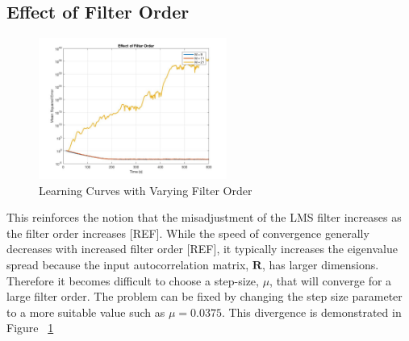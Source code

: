 \documentclass[journal]{IEEEtran}
\begin{document}
\subsection{Effect of Filter Order}
\begin{figure}[H]
  \centering
  \captionsetup{justification=centering}
  \includegraphics[width=0.55\textwidth, right] {Plots/Project1_Part3.jpg}
  \caption{Learning Curves with Varying Filter Order}
    \label{fig:filterorder1}
\end{figure}
This reinforces the notion that the misadjustment
of the LMS filter increases as the filter order increases [REF]. While the speed of convergence
generally decreases with increased filter order [REF], it typically increases the eigenvalue spread
because the input autocorrelation matrix, $\boldsymbol{R}$, has larger dimensions. Therefore it becomes difficult to
choose a step-size, $\mu$, that will converge for a large filter order. The problem can be fixed by changing the
step size parameter to a more suitable value such as $ \mu = 0.0375$.
This divergence is demonstrated in Figure ~\ref{fig:filterorder1}
\end{document}
